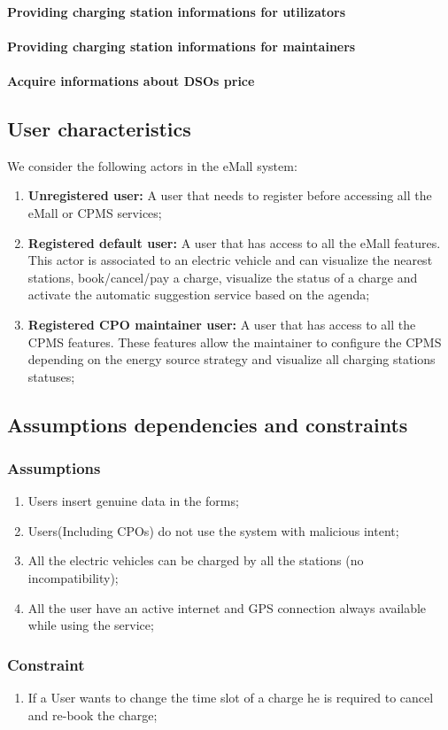 \paragraph{Providing charging station informations for utilizators}
\paragraph{Providing charging station informations for maintainers}
\paragraph{Acquire informations about \acp{DSO} price}



\subsection{User characteristics}
We consider the following actors in the \ac{eMall} system:
\begin{enumerate}[label=\textbf{A\arabic*}]
      \item \textbf{Unregistered user:} A user that needs to register before accessing all the \ac{eMall} or \ac{CPMS} services;
      \item \textbf{Registered default user:} A user that has access to all the \ac{eMall} features.
            This actor is associated to an electric vehicle and can visualize the nearest stations, book/cancel/pay a charge, visualize the status of a charge and activate the automatic suggestion service based on the agenda;
      \item \textbf{Registered CPO maintainer user:} A user that has access to all the \ac{CPMS} features.
            These features allow the maintainer to configure the \ac{CPMS} depending on the energy source strategy and visualize all charging stations statuses;
\end{enumerate}

\subsection{Assumptions dependencies and constraints}
\subsubsection{Assumptions}
\begin{enumerate}[label=\textbf{DA\arabic*}]
      \item Users insert genuine data in the forms;
      \item Users(Including CPOs) do not use the system with malicious intent;
      \item All the electric vehicles can be charged by all the stations (no incompatibility);
      \item All the user have an active internet and GPS connection always available while using the service;
\end{enumerate}
\subsubsection{Constraint}
\begin{enumerate}[label=\textbf{C\arabic*}]
      \item If a User wants to change the time slot of a charge he is required to cancel and re-book the charge;
\end{enumerate}

\clearpage